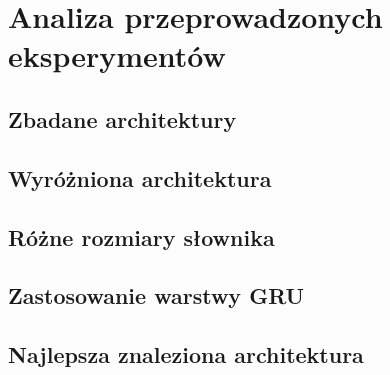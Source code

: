 \newpage %
 

\section{Analiza przeprowadzonych eksperymentów}

\subsection{Zbadane architektury}
\subsection{Wyróżniona architektura}
\subsection{Różne rozmiary słownika}
\subsection{Zastosowanie warstwy GRU}
\subsection{Najlepsza znaleziona architektura}
